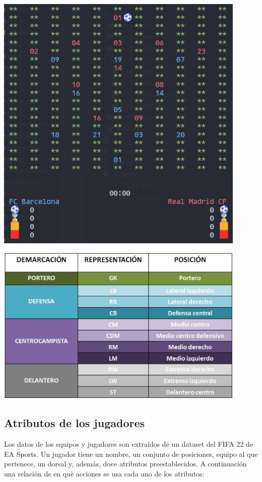 \documentclass{article}
\begin{document}
\includegraphics*[width=0.9\textwidth]{filed.jpg}
\bigskip

\includegraphics*[width=0.9\textwidth]{report_table.jpg}
\bigskip


\subsection{Atributos de los jugadores}
Los datos de los equipos y jugadores son extraídos de un dataset del FIFA 22 de EA Sports. Un jugador tiene un nombre, 
un conjunto de posiciones, equipo al que pertenece, un dorsal y, además, doce atributos preestablecidos. A 
continuación una relación de en què acciones se usa cada uno de los atributos:
\end{document}
